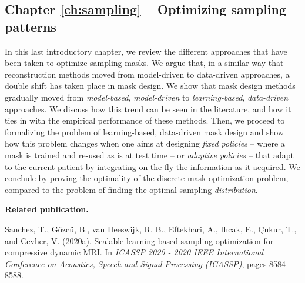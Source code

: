 \subsection*{Chapter \ref{ch:sampling} -- Optimizing sampling patterns}
In this last introductory chapter, we review the different approaches that have been taken to optimize {sampling masks}. We argue that, in a similar way that reconstruction methods moved from model-driven to data-driven approaches, a double shift has taken place in mask design. We show that mask design methods gradually moved from {\textit{model-based}, \textit{model-driven} to \textit{learning-based}, \textit{data-driven} approaches}. We discuss how this trend can be seen in the literature, and how it ties in with the empirical performance of these methods. 
Then, we proceed to formalizing the problem of learning-based, data-driven mask design and show how this problem changes when one aims at designing {\textit{fixed policies}} -- where a mask is trained and re-used as is at test time -- or {\textit{adaptive policies}} -- that adapt to the current patient by integrating on-the-fly the information as it acquired. We conclude by proving the optimality of the discrete mask optimization problem, compared to the problem of finding the optimal {sampling \textit{distribution}}.

\textbf{Related publication.} 
\begin{adjustwidth}{.5cm}{}
Sanchez, T., G{\"o}zc{\"u}, B., van Heeswijk, R. B., Eftekhari, A., Il{\i}cak, E., \c{C}ukur, T., and Cevher, V. (2020a). Scalable learning-based sampling optimization for compressive dynamic MRI. In \textit{ICASSP 2020 - 2020 IEEE International Conference on Acoustics, Speech and Signal Processing (ICASSP)}, pages 8584–8588.
\end{adjustwidth}
